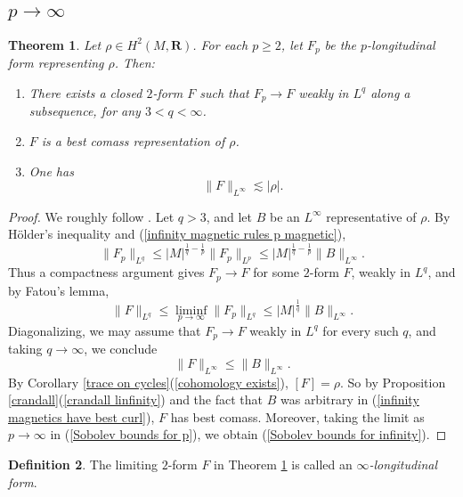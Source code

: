 \documentclass[reqno,11pt]{amsart}
\newcommand{\RR}{\mathbf{R}}
\newcommand{\dfn}[1]{\emph{#1}\index{#1}}
\newtheorem{theorem}{Theorem}[section]
\theoremstyle{definition}
\newtheorem{definition}[theorem]{Definition}
\numberwithin{equation}{section}
\begin{document}
\subsection{\texorpdfstring{$p \to \infty$}{The limit as p goes to infinity}}
\begin{theorem}\label{existence infinity}
Let $\rho \in H^2(M, \RR)$.
For each $p \geq 2$, let $F_p$ be the $p$-longitudinal form representing $\rho$. Then:
\begin{enumerate}
\item There exists a closed $2$-form $F$ such that $F_p \to F$ weakly in $L^q$ along a subsequence, for any $3 < q < \infty$.
\item $F$ is a best comass representation of $\rho$.
\item One has 
\begin{equation}\label{Sobolev bounds for infinity}
	\|F\|_{L^\infty} \lesssim |\rho|.
\end{equation}
\end{enumerate}
\end{theorem}
\begin{proof}
We roughly follow \cite[\S3]{Lindqvist14}.
Let $q > 3$, and let $B$ be an $L^\infty$ representative of $\rho$.
By H\"older's inequality and (\ref{infinity magnetic rules p magnetic}),
\begin{equation}\label{uniform bounds in p by best curl}
	\|F_p\|_{L^q} \leq |M|^{\frac{1}{q} - \frac{1}{p}} \|F_p\|_{L^p} \leq |M|^{\frac{1}{q} - \frac{1}{p}} \|B\|_{L^\infty}.
\end{equation}
Thus a compactness argument gives $F_p \to F$ for some $2$-form $F$, weakly in $L^q$, and by Fatou's lemma, 
$$\|F\|_{L^q} \leq \liminf_{p \to \infty} \|F_p\|_{L^q} \leq |M|^{\frac{1}{q}} \|B\|_{L^\infty}.$$
Diagonalizing, we may assume that $F_p \to F$ weakly in $L^q$ for every such $q$, and taking $q \to \infty$, we conclude 
\begin{equation}\label{infinity magnetics have best curl}
	\|F\|_{L^\infty} \leq \|B\|_{L^\infty}.
\end{equation}
By Corollary \ref{trace on cycles}(\ref{cohomology exists}), $[F] = \rho$.
So by Proposition \ref{crandall}(\ref{crandall linfinity}) and the fact that $B$ was arbitrary in (\ref{infinity magnetics have best curl}), $F$ has best comass.
Moreover, taking the limit as $p \to \infty$ in (\ref{Sobolev bounds for p}), we obtain (\ref{Sobolev bounds for infinity}).
\end{proof}

\begin{definition}
The limiting $2$-form $F$ in Theorem \ref{existence infinity} is called an \dfn{$\infty$-longitudinal form}.
\end{definition}
\end{document}
